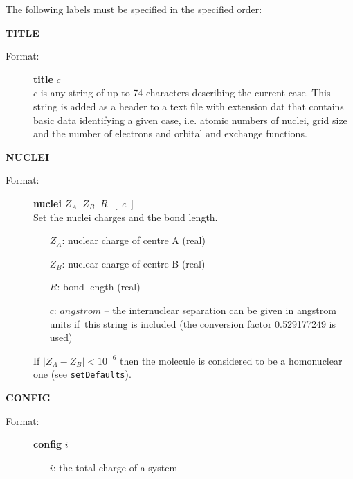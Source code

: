 \documentclass[12pt,a4paper]{article}
\newcommand{\ft}[1]{\texttt{#1}}
\begin{document}
The following labels must be specified in the specified order:
\begin{description}
\item \textbf{TITLE} 
\begin{description} 
\item[Format:] \textbf{title} $c$ \\ $c$ is any string of up to 74 characters describing
  the current case. This string is added as a header to a text file with extension dat
  that contains basic data identifying a given case, i.e. atomic numbers of nuclei, grid
  size and the number of electrons and orbital and exchange functions.
\end{description} 

\item \textbf{NUCLEI} 
\begin{description} 
\item[Format:] \textbf{nuclei} $Z_A \;\;Z_B\;\; R \;\;[\; c\;]$ \\ 
  Set the nuclei charges and the bond length.

\begin{itemize} 
\item[$Z_A$:] nuclear charge of centre A (real)
\item[$Z_B$:] nuclear charge of centre B (real) 
\item[$R$:] bond length (real)
\item[$c$:] $angstrom$ -- the internuclear separation can be given in
  angstrom units if~this string is included (the conversion factor
  0.529177249 is used)
\end{itemize} 
  If $|Z_A-Z_B|<10^{-6}$ then the molecule is considered to be a
  homonuclear one (see \ft{setDefaults}).
\end{description} 
 
\item \textbf{CONFIG}  
\begin{description} 
\item[Format:] \textbf{config} $i$ 
\begin{itemize} 
\item[$i$:] the total charge of a system
\end{itemize} 
\end{description} 


\end{description}
\end{document}
